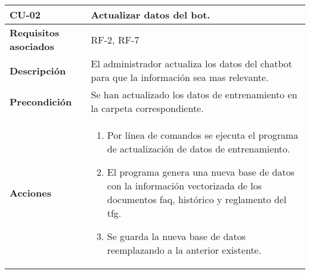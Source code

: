 \newpage
\begin{longtable}[H]{@{}ll@{}}
	\toprule
	\begin{minipage}[b]{0.23\columnwidth}\raggedright\strut
		\textbf{CU-02}\strut
	\end{minipage} & \begin{minipage}[b]{0.71\columnwidth}\raggedright\strut
		\textbf{Actualizar datos del bot.}\strut
	\end{minipage}\tabularnewline
	\midrule
	\endhead  
	\begin{minipage}[t]{0.23\columnwidth}\raggedright\strut
		\textbf{Requisitos asociados}\strut
	\end{minipage} & \begin{minipage}[t]{0.71\columnwidth}\raggedright\strut
		RF-2, RF-7\strut
	\end{minipage}\tabularnewline
	\begin{minipage}[t]{0.23\columnwidth}\raggedright\strut
		\textbf{Descripción}\strut
	\end{minipage} & \begin{minipage}[t]{0.71\columnwidth}\raggedright\strut
		El administrador actualiza los datos del chatbot para que la información sea mas relevante.\strut
	\end{minipage}\tabularnewline
	\begin{minipage}[t]{0.23\columnwidth}\raggedright\strut
		\textbf{Precondición}\strut
	\end{minipage} & \begin{minipage}[t]{0.71\columnwidth}\raggedright\strut
		Se han actualizado los datos de entrenamiento en la carpeta correspondiente.\strut
	\end{minipage}\tabularnewline
	\begin{minipage}[t]{0.23\columnwidth}\raggedright\strut
		\textbf{Acciones}\strut
	\end{minipage} & \begin{minipage}[t]{0.71\columnwidth}\raggedright\strut
		\begin{enumerate}
			\def\labelenumi{\arabic{enumi}.}
			\tightlist
			\item Por línea de comandos se ejecuta el programa de actualización de datos de entrenamiento.
                \item El programa genera una nueva base de datos con la información vectorizada de los documentos \acrshort{faq}, histórico y reglamento del \acrshort{tfg}.
			\item Se guarda la nueva base de datos reemplazando a la anterior existente.

\end{enumerate}
\end{minipage}
\end{longtable}
